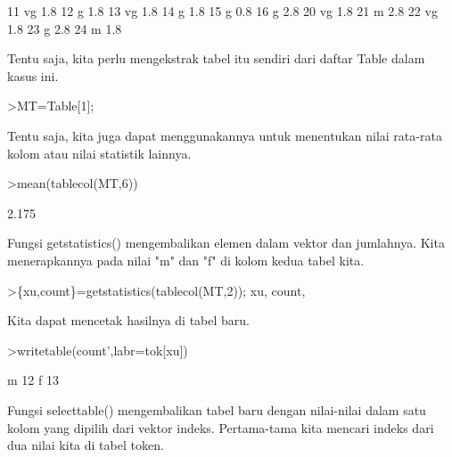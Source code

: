 \documentclass[a4paper,10pt]{article}
\begin{document}
\begin{eulernotebook}
\begin{euleroutput}
          11         vg       1.8
          12          g       1.8
          13         vg       1.8
          14          g       1.8
          15          g       0.8
          16          g       2.8
          20         vg       1.8
          21          m       2.8
          22         vg       1.8
          23          g       2.8
          24          m       1.8
\end{euleroutput}
\begin{eulercomment}
Tentu saja, kita perlu mengekstrak tabel itu sendiri dari daftar Table
dalam kasus ini.
\end{eulercomment}
\begin{eulerprompt}
>MT=Table[1];
\end{eulerprompt}
\begin{eulercomment}
Tentu saja, kita juga dapat menggunakannya untuk menentukan nilai
rata-rata kolom atau nilai statistik lainnya.
\end{eulercomment}
\begin{eulerprompt}
>mean(tablecol(MT,6))
\end{eulerprompt}
\begin{euleroutput}
  2.175
\end{euleroutput}
\begin{eulercomment}
Fungsi getstatistics() mengembalikan elemen dalam vektor dan
jumlahnya. Kita menerapkannya pada nilai "m" dan "f" di kolom kedua
tabel kita.
\end{eulercomment}
\begin{eulerprompt}
>\{xu,count\}=getstatistics(tablecol(MT,2)); xu, count,
\end{eulerprompt}
\begin{euleroutput}
  [1,  3]
  [12,  13]
\end{euleroutput}
\begin{eulercomment}
Kita dapat mencetak hasilnya di tabel baru.
\end{eulercomment}
\begin{eulerprompt}
>writetable(count',labr=tok[xu])
\end{eulerprompt}
\begin{euleroutput}
           m        12
           f        13
\end{euleroutput}
\begin{eulercomment}
Fungsi selecttable() mengembalikan tabel baru dengan nilai-nilai dalam
satu kolom yang dipilih dari vektor indeks. Pertama-tama kita mencari
indeks dari dua nilai kita di tabel token.
\end{eulercomment}

\end{eulernotebook}
\end{document}
